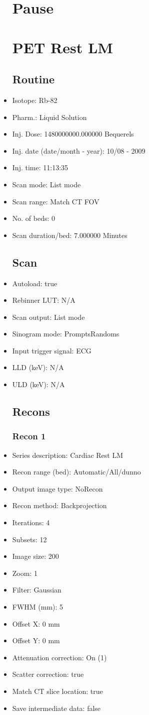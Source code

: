 \documentclass[12pt]{article}
\begin{document}
\begin{itemize}
\section{Pause}
\section{PET Rest LM}\subsection{Routine}
\item Isotope: Rb-82
\item Pharm.: Liquid Solution
\item Inj. Dose: 1480000000.000000 Bequerels
\item Inj. date (date/month - year): 10/08 - 2009
\item Inj. time: 11:13:35
\item Scan mode: List mode
\item Scan range: Match CT FOV
\item No. of beds: 0
\item Scan duration/bed: 7.000000 Minutes
\subsection{Scan}
\item Autoload: true
\item Rebinner LUT: N/A
\item Scan output: List mode
\item Sinogram mode: PromptsRandoms
\item Input trigger signal: ECG
\item LLD (keV): N/A
\item ULD (keV): N/A
\subsection{Recons}
\subsubsection{Recon 1}
\item Series description: Cardiac Rest LM
\item Recon range (bed): Automatic/All/dunno
\item Output image type: NoRecon
\item Recon method: Backprojection
\item Iterations: 4
\item Subsets: 12
\item Image size: 200
\item Zoom: 1
\item Filter: Gaussian
\item FWHM (mm): 5
\item Offset X: 0 mm
\item Offset Y: 0 mm
\item Attenuation correction: On (1)
\item Scatter correction: true
\item Match CT slice location: true
\item Save intermediate data: false

\end{itemize}
\end{document}
